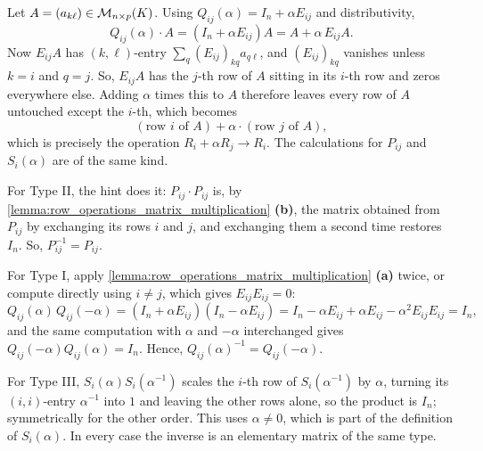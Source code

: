 \begin{exercisesolution}
\label{sol:row_operations_matrix_multiplication_a}
Let $A = (a_{k\ell}) \in \mathcal{M}_{n \times p}(K)$. Using $Q_{ij}(\alpha) = I_n + \alpha E_{ij}$ and distributivity,
\[
Q_{ij}(\alpha) \cdot A = (I_n + \alpha E_{ij}) A = A + \alpha \, E_{ij} A.
\]
Now $E_{ij} A$ has $(k, \ell)$-entry $\sum_{q} (E_{ij})_{kq} a_{q\ell}$, and $(E_{ij})_{kq}$ vanishes unless $k = i$ and $q = j$. So, $E_{ij}A$ has the $j$-th row of $A$ sitting in its $i$-th row and zeros everywhere else. Adding $\alpha$ times this to $A$ therefore leaves every row of $A$ untouched except the $i$-th, which becomes
\[
(\text{row } i \text{ of } A) + \alpha \cdot (\text{row } j \text{ of } A),
\]
which is precisely the operation $R_i + \alpha R_j \longrightarrow R_i$. The calculations for $P_{ij}$ and $S_i(\alpha)$ are of the same kind.
\end{exercisesolution}

\begin{exercisesolution}
\label{sol:elementary_matrix_inverses}
For Type II, the hint does it: $P_{ij} \cdot P_{ij}$ is, by \cref{lemma:row_operations_matrix_multiplication} \textbf{(b)}, the matrix obtained from $P_{ij}$ by exchanging its rows $i$ and $j$, and exchanging them a second time restores $I_n$. So, $P_{ij}^{-1} = P_{ij}$.

For Type I, apply \cref{lemma:row_operations_matrix_multiplication} \textbf{(a)} twice, or compute directly using $i \neq j$, which gives $E_{ij} E_{ij} = 0$:
\[
Q_{ij}(\alpha) \, Q_{ij}(-\alpha) = (I_n + \alpha E_{ij})(I_n - \alpha E_{ij}) = I_n - \alpha E_{ij} + \alpha E_{ij} - \alpha^2 E_{ij}E_{ij} = I_n,
\]
and the same computation with $\alpha$ and $-\alpha$ interchanged gives $Q_{ij}(-\alpha) Q_{ij}(\alpha) = I_n$. Hence, $Q_{ij}(\alpha)^{-1} = Q_{ij}(-\alpha)$.

For Type III, $S_i(\alpha) S_i(\alpha^{-1})$ scales the $i$-th row of $S_i(\alpha^{-1})$ by $\alpha$, turning its $(i,i)$-entry $\alpha^{-1}$ into $1$ and leaving the other rows alone, so the product is $I_n$; symmetrically for the other order. This uses $\alpha \neq 0$, which is part of the definition of $S_i(\alpha)$. In every case the inverse is an elementary matrix of the same type.
\end{exercisesolution}

